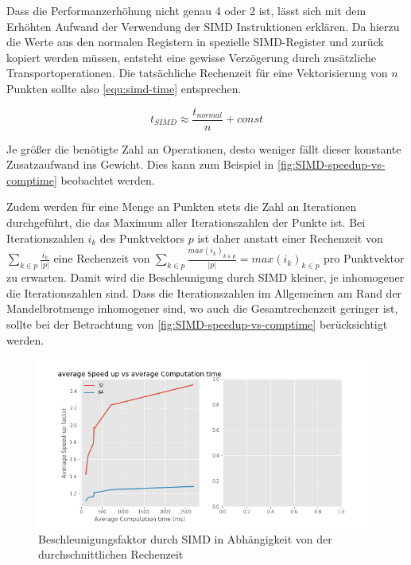 Dass die Performanzerhöhung nicht genau 4 oder 2 ist, lässt sich mit dem Erhöhten Aufwand der Verwendung
der SIMD Instruktionen erklären.
Da hierzu die Werte aus den normalen Registern in spezielle SIMD-Register und zurück
kopiert werden müssen, entsteht eine gewisse Verzögerung durch zusätzliche Transportoperationen.
Die tatsächliche Rechenzeit für eine Vektorisierung von \(n\) Punkten sollte also \autoref{equ:simd-time} entsprechen.

\begin{equation}\label{equ:simd-time}
    t_{SIMD} \approx \frac{t_{normal}}{n}+ const
\end{equation}

Je größer die benötigte Zahl an Operationen, desto weniger fällt dieser konstante Zusatzaufwand ins Gewicht.
Dies kann zum Beispiel in \autoref{fig:SIMD-speedup-vs-comptime} beobachtet werden.

Zudem werden für eine Menge an Punkten stets die Zahl an Iterationen durchgeführt,
die das Maximum aller Iterationszahlen der Punkte ist.
Bei Iterationszahlen \(i_k\) des Punktvektors \(p\) ist daher
anstatt einer Rechenzeit von \(\sum_{k \in p} \frac{i_k }{ | p | }\) eine Rechenzeit von
\(\sum_{k \in p} \frac{max(i_k)_{k \in p }}{|p|} = max(i_k)_{k \in p }\) pro Punktvektor zu erwarten.
Damit wird die Beschleunigung durch SIMD kleiner, je inhomogener die Iterationszahlen sind.
Dass die Iterationszahlen im Allgemeinen am Rand der Mandelbrotmenge inhomogener sind,
wo auch die Gesamtrechenzeit geringer ist, sollte bei der Betrachtung von \autoref{fig:SIMD-speedup-vs-comptime} berücksichtigt werden.

\begin{figure}
	\centering
	\includegraphics[width=0.9\linewidth]{img/Evaluation/speedupvscomptime}
    \caption{Beschleunigungsfaktor durch SIMD in Abhängigkeit von der durchschnittlichen Rechenzeit}
  	\label{fig:SIMD-speedup-vs-comptime}
\end{figure}

